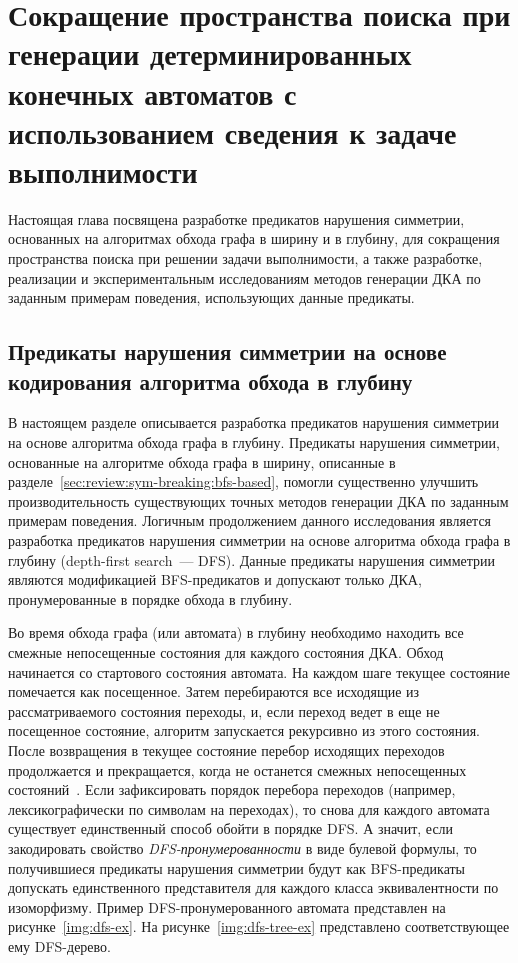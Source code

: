 
\chapter{Сокращение пространства поиска при генерации детерминированных конечных автоматов с использованием сведения к задаче выполнимости}
\label{sec:space}

Настоящая глава посвящена разработке предикатов нарушения симметрии, основанных на алгоритмах обхода графа в ширину и в глубину, для сокращения пространства поиска при решении задачи выполнимости, а также разработке, реализации и экспериментальным исследованиям методов генерации ДКА по заданным примерам поведения, использующих данные предикаты.


\section{Предикаты нарушения симметрии на основе кодирования алгоритма обхода в глубину}
\label{sec:space:dfs}

В настоящем разделе описывается разработка предикатов нарушения симметрии на основе алгоритма обхода графа в глубину.
Предикаты нарушения симметрии, основанные на алгоритме обхода графа в ширину, описанные в разделе~\ref{sec:review:sym-breaking:bfs-based}, помогли существенно улучшить производительность существующих точных методов генерации ДКА по заданным примерам поведения.
Логичным продолжением данного исследования является разработка предикатов нарушения симметрии на основе алгоритма обхода графа в глубину (depth-first search~--- DFS).
Данные предикаты нарушения симметрии являются модификацией BFS-предикатов и допускают только ДКА, пронумерованные в порядке обхода в глубину.

Во время обхода графа (или автомата) в глубину необходимо находить все смежные непосещенные состояния для каждого состояния ДКА.
Обход начинается со стартового состояния автомата.
На каждом шаге текущее состояние помечается как посещенное.
Затем перебираются все исходящие из рассматриваемого состояния переходы, и, если переход ведет в еще не посещенное состояние, алгоритм запускается рекурсивно из этого состояния.
После возвращения в текущее состояние перебор исходящих переходов продолжается и прекращается, когда не останется смежных непосещенных состояний~\cite{DBLP:books/mg/CormenLRS01-dfs}.
Если зафиксировать порядок перебора переходов (например, лексикографически по символам на переходах), то снова для каждого автомата существует единственный способ обойти в порядке DFS.
А значит, если закодировать свойство \emph{DFS-пронумерованности} в виде булевой формулы, то получившиеся предикаты нарушения симметрии будут как BFS-предикаты допускать единственного представителя для каждого класса эквивалентности по изоморфизму.
Пример DFS-пронумерованного автомата представлен на рисунке~\ref{img:dfs-ex}.
На рисунке~\ref{img:dfs-tree-ex} представлено соответствующее ему DFS-дерево.

